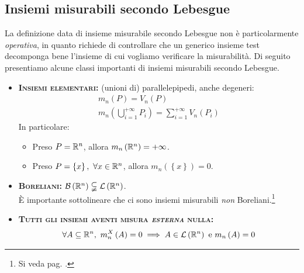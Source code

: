 \subsection{Insiemi misurabili secondo Lebesgue}
La definizione data di insieme misurabile secondo Lebesgue non è particolarmente \textit{operativa}, in quanto richiede di controllare che un generico insieme test decomponga bene l'insieme di cui vogliamo verificare la misurabilità.
Di seguito presentiamo alcune classi importanti di insiemi misurabili secondo Lebesgue.
\begin{itemize}
	\item \textsc{\textbf{Insiemi elementari:}} (unioni di) parallelepipedi, anche degeneri:
	\begin{gather*}
		m_n(P)=V_n(P)\\
		m_n\left(\bigcup_{i=1}^{+\infty} P_i\right)=\sum_{i=1}^{+\infty}V_n\left(P_i\right)
	\end{gather*}
In particolare:
\begin{itemize}
	\item Preso $P=\mathbb{R}^n$, allora $m_n\left(\mathbb{R}^n\right)=+\infty$.
	\item Preso $P=\left\{x\right\},\ \forall x\in\mathbb{R}^n$, allora $m_n\left(\left\{x\right\}\right)=0$.
\end{itemize}
\item \textsc{\textbf{Boreliani:}} $\mathcal{B}\left(\mathbb{R}^n\right)\subsetneqq\mathcal{L}\left(\mathbb{R}^n\right)$.\\
È importante sottolineare che ci sono insiemi misurabili \textit{non} Boreliani.\footnote{Si veda pag. \pageref{funzionecantor}.}
\item \textsc{\textbf{Tutti gli insiemi aventi misura \textit{esterna} nulla:}}
\begin{equation*}
	\forall A\subseteq \realset^n,\ m_n^X\left(A\right)=0\implies A\in\mathcal{L}\left(\realset^n\right)\text{ e }m_n\left(A\right)=0
\end{equation*}
\end{itemize}
